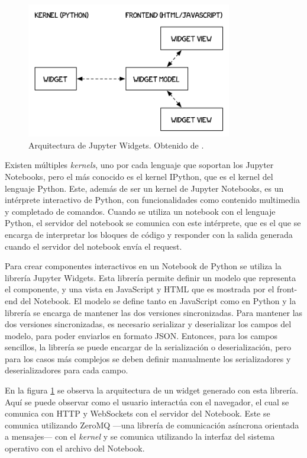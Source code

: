 \begin{figure}[h]
    \centering
    \includegraphics[width=0.8\textwidth]{imagenes/notebook/WidgetModelView}
    \caption[Arquitectura de Jupyter Widgets]{Arquitectura de Jupyter Widgets. Obtenido de \cite{arq-widget}.}
    \label{fig:widget_arq}
\end{figure}

Existen múltiples \textit{kernels}, uno por cada lenguaje que soportan los Jupyter Notebooks, pero el más conocido es el kernel IPython, que es el kernel del lenguaje Python. Este, además de ser un kernel de Jupyter Notebooks, es un intérprete interactivo de Python, con funcionalidades como contenido multimedia y completado de comandos. Cuando se utiliza un notebook con el lenguaje Python, el servidor del notebook se comunica con este intérprete, que es el que se encarga de interpretar los bloques de código y responder con la salida generada cuando el servidor del notebook envía el request.

Para crear componentes interactivos en un Notebook de Python se utiliza la librería Jupyter Widgets. Esta librería permite definir un modelo que representa el componente, y una vista en JavaScript y HTML que es mostrada por el front-end del Notebook. El modelo se define tanto en JavaScript como en Python y la librería se encarga de mantener las dos versiones sincronizadas. Para mantener las dos versiones sincronizadas, es necesario serializar y deserializar los campos del modelo, para poder enviarlos en formato JSON. Entonces, para los campos sencillos, la librería se puede encargar de la serialización o deserialización, pero para los casos más complejos se deben definir manualmente los serializadores y deserializadores para cada campo. 

En la figura \ref{fig:widget_arq} se observa la arquitectura de un widget generado con esta librería. Aquí se puede observar como el usuario interactúa con el navegador, el cual se comunica con HTTP y WebSockets con el servidor del Notebook. Este se comunica utilizando ZeroMQ ---una librería de comunicación asíncrona orientada a mensajes--- con el \textit{kernel} y se comunica utilizando la interfaz del sistema operativo con el archivo del Notebook.

